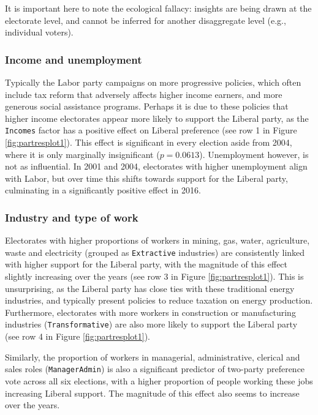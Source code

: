 \documentclass[11pt,a4paper,]{article}
\begin{document}
It is important here to note the ecological fallacy: insights are being
drawn at the electorate level, and cannot be inferred for another
disaggregate level (e.g., individual voters).

\subsubsection{Income and unemployment}\label{income-and-unemployment}

Typically the Labor party campaigns on more progressive policies, which
often include tax reform that adversely affects higher income earners,
and more generous social assistance programs. Perhaps it is due to these
policies that higher income electorates appear more likely to support
the Liberal party, as the \texttt{Incomes} factor has a positive effect
on Liberal preference (see row 1 in Figure \ref{fig:partresplot1}). This
effect is significant in every election aside from 2004, where it is
only marginally insignificant (\(p = 0.0613\)). Unemployment however, is
not as influential. In 2001 and 2004, electorates with higher
unemployment align with Labor, but over time this shifts towards support
for the Liberal party, culminating in a significantly positive effect in
2016.

\subsubsection{Industry and type of
work}\label{industry-and-type-of-work}

Electorates with higher proportions of workers in mining, gas, water,
agriculture, waste and electricity (grouped as \texttt{Extractive}
industries) are consistently linked with higher support for the Liberal
party, with the magnitude of this effect slightly increasing over the
years (see row 3 in Figure \ref{fig:partresplot1}). This is
unsurprising, as the Liberal party has close ties with these traditional
energy industries, and typically present policies to reduce taxation on
energy production. Furthermore, electorates with more workers in
construction or manufacturing industries (\texttt{Transformative}) are
also more likely to support the Liberal party (see row 4 in Figure
\ref{fig:partresplot1}).

Similarly, the proportion of workers in managerial, administrative,
clerical and sales roles (\texttt{ManagerAdmin}) is also a significant
predictor of two-party preference vote across all six elections, with a
higher proportion of people working these jobs increasing Liberal
support. The magnitude of this effect also seems to increase over the
years.
\end{document}
